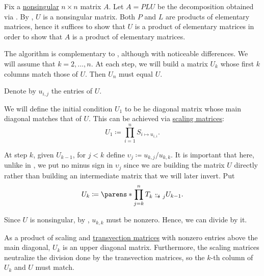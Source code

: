 \begin{algorithm}\label{alg:elementary_matrix_decomposition}
  Fix a \hyperref[def:inverse_matrix]{nonsingular} \( n \times n \) matrix \( A \). Let \( A = PLU \) be the decomposition obtained via . By , \( U \) is a nonsingular matrix. Both \( P \) and \( L \) are products of elementary matrices, hence it suffices to show that \( U \) is a product of elementary matrices in order to show that \( A \) is a product of elementary matrices.

  The algorithm is complementary to , although with noticeable differences. We will assume that \( k = 2, \ldots, n \). At each step, we will build a matrix \( U_k \) whose first \( k \) columns match those of \( U \). Then \( U_n \) must equal \( U \).

  Denote by \( u_{i,j} \) the entries of \( U \).

  \begin{thmenum}
     We will define the initial condition \( U_1 \) to be he diagonal matrix whose main diagonal matches that of \( U \). This can be achieved via \hyperref[def:elementary_matrix/scaling]{scaling matrices}:
    \begin{equation*}
      U_1 \coloneqq \prod_{i=1}^n S_{i \mapsto u_{i,i}}.
    \end{equation*}

     At step \( k \), given \( U_{k-1} \), for \( j < k \) define \( \upsilon_j \coloneqq u_{k,j} / u_{k,k} \). It is important that here, unlike in , we put no minus sign in \( \upsilon_j \) since we are building the matrix \( U \) directly rather than building an intermediate matrix that we will later invert. Put
    \begin{equation*}
      U_k \coloneqq \parens*{ \prod_{j=k}^n T_{k \reloset {\upsilon_j} \to j} } U_{k-1}.
    \end{equation*}

    Since \( U \) is nonsingular, by , \( u_{k,k} \) must be nonzero. Hence, we can divide by it.

    As a product of scaling and \hyperref[def:elementary_matrix/transvection]{transvection matrices} with nonzero entries above the main diagonal, \( U_k \) is an upper diagonal matrix. Furthermore, the scaling matrices neutralize the division done by the transvection matrices, so the \( k \)-th column of \( U_k \) and \( U \) must match.
  \end{thmenum}
\end{algorithm}

